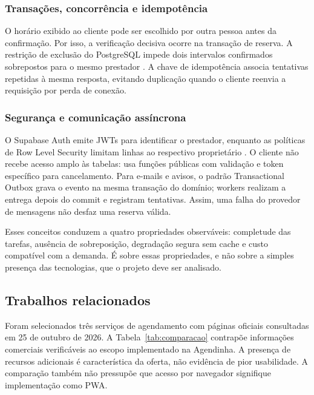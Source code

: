 \subsubsection{Transações, concorrência e idempotência}

O horário exibido ao cliente pode ser escolhido por outra pessoa antes da confirmação. Por isso, a verificação decisiva ocorre na transação de reserva. A restrição de exclusão do PostgreSQL impede dois intervalos confirmados sobrepostos para o mesmo prestador \cite{postgresconstraints}. A chave de idempotência associa tentativas repetidas à mesma resposta, evitando duplicação quando o cliente reenvia a requisição por perda de conexão.

\subsubsection{Segurança e comunicação assíncrona}

O Supabase Auth emite JWTs para identificar o prestador, enquanto as políticas de Row Level Security limitam linhas ao respectivo proprietário \cite{supabasetls}. O cliente não recebe acesso amplo às tabelas: usa funções públicas com validação e token específico para cancelamento. Para e-mails e avisos, o padrão Transactional Outbox grava o evento na mesma transação do domínio; workers realizam a entrega depois do commit e registram tentativas. Assim, uma falha do provedor de mensagens não desfaz uma reserva válida.

Esses conceitos conduzem a quatro propriedades observáveis: completude das tarefas, ausência de sobreposição, degradação segura sem cache e custo compatível com a demanda. É sobre essas propriedades, e não sobre a simples presença das tecnologias, que o projeto deve ser analisado.

\subsection{Trabalhos relacionados}

Foram selecionados três serviços de agendamento com páginas oficiais consultadas em 25 de outubro de 2026. A Tabela~\ref{tab:comparacao} contrapõe informações comerciais verificáveis ao escopo implementado na Agendinha. A presença de recursos adicionais é característica da oferta, não evidência de pior usabilidade. A comparação também não pressupõe que acesso por navegador signifique implementação como PWA.

